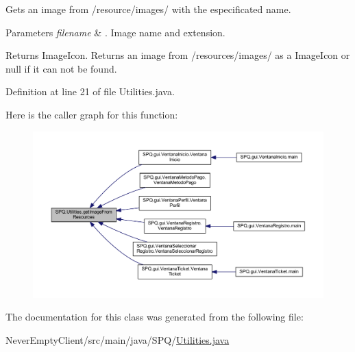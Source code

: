 Gets an image from /resource/images/ with the especificated name. 
\begin{DoxyParams}{Parameters}
{\em filename} & . Image name and extension. \\
\hline
\end{DoxyParams}
\begin{DoxyReturn}{Returns}
Image\+Icon. Returns an image from /resources/images/ as a Image\+Icon or null if it can not be found. 
\end{DoxyReturn}


Definition at line 21 of file Utilities.\+java.

Here is the caller graph for this function\+:\nopagebreak
\begin{figure}[H]
\begin{center}
\leavevmode
\includegraphics[width=350pt]{class_s_p_q_1_1_utilities_a1ca9779d00f9480c9c0ccb654c558fbb_icgraph}
\end{center}
\end{figure}


The documentation for this class was generated from the following file\+:\begin{DoxyCompactItemize}
\item 
Never\+Empty\+Client/src/main/java/\+S\+P\+Q/\mbox{\hyperlink{_utilities_8java}{Utilities.\+java}}\end{DoxyCompactItemize}
